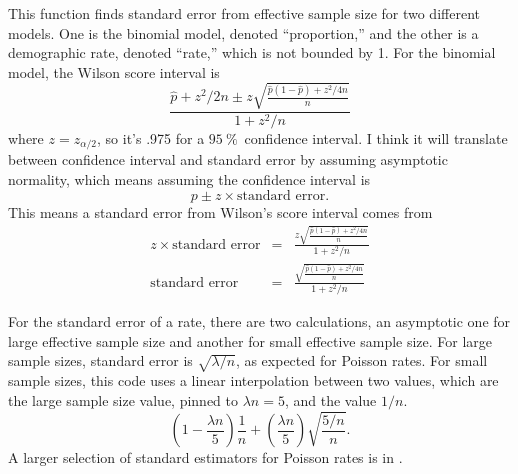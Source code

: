 \documentclass[fleqn,10pt]{olplainarticle}
\begin{document}
This function finds standard error from effective sample size for two
different models. One is the binomial model, denoted ``proportion,''
and the other is a demographic rate, denoted ``rate,'' which is not bounded
by 1. For the binomial model, the Wilson score interval is
\begin{equation}
    \frac{\hat{p}+z^2/2n\pm z\sqrt{\frac{\hat{p}(1-\hat{p})+z^2/4n}{n}}}{1+z^2/n}
\end{equation}
where $z=z_{\alpha/2}$, so it's .975 for a $95\:\%$~confidence interval.
I think it will translate between confidence interval and standard
error by assuming asymptotic normality, which means assuming the
confidence interval is
\begin{equation}
    p\pm z \times\mbox{standard error}.
\end{equation}
This means a standard error from Wilson's score interval comes from
\begin{eqnarray}
    z \times\mbox{standard error} & = & \frac{z\sqrt{\frac{\hat{p}(1-\hat{p})+z^2/4n}{n}}}{1+z^2/n} \\
    \mbox{standard error} & = & \frac{\sqrt{\frac{\hat{p}(1-\hat{p})+z^2/4n}{n}}}{1+z^2/n}
\end{eqnarray}

For the standard error of a rate, there are two calculations, an asymptotic one
for large effective sample size and another for small effective sample size.
For large sample sizes, standard error is $\sqrt{\lambda/n}$, as expected for Poisson
rates. For small sample sizes, this code uses a linear interpolation between two values,
which are the large sample size value, pinned to $\lambda n=5$, and the value $1/n$.
\begin{equation}
    \left(1-\frac{\lambda n}{5}\right) \frac{1}{n} + \left(\frac{\lambda n}{5}\right)\sqrt{\frac{5/n}{n}}.
\end{equation}
A larger selection of standard estimators for Poisson rates is in \citet{patil2012}.
\end{document}
